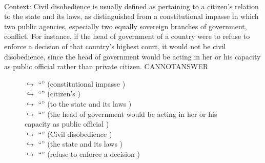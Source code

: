 \documentclass[11pt,a4paper, onecolumn]{article}
\begin{document}
\\ Context: Civil disobedience is usually defined as pertaining to a citizen's relation to the state and its laws, as distinguished from a constitutional impasse in which two public agencies, especially two equally sovereign branches of government, conflict. For instance, if the head of government of a country were to refuse to enforce a decision of that country's highest court, it would not be civil disobedience, since the head of government would be acting in her or his capacity as public official rather than private citizen. CANNOTANSWER

\begin{figure}[t] \small \begin{tcolorbox}[boxsep=0pt,left=5pt,right=0pt,top=2pt,colback = yellow!5] \begin{dialogue}
 \small 
\colorbox{pink!25}{$\hookrightarrow$}
{ ``'' (constitutional impasse ) }
\\
\colorbox{pink!25}{$\hookrightarrow$}
{ ``'' (citizen's ) }
\\
\colorbox{pink!25}{$\hookrightarrow$}
{ ``'' (to the state and its laws ) }
\\
\colorbox{pink!25}{$\hookrightarrow$}
{ ``'' (the head of government would be acting in her or his capacity as public official ) }
\\
\colorbox{pink!25}{$\hookrightarrow$}
{ ``'' (Civil disobedience ) }
\\
\colorbox{pink!25}{$\hookrightarrow$}
{ ``'' (the state and its laws ) }
\\
\colorbox{pink!25}{$\hookrightarrow$}
{ ``'' (refuse to enforce a decision ) }
\\

\end{dialogue}
\end{tcolorbox}
\end{figure}
\end{document}
